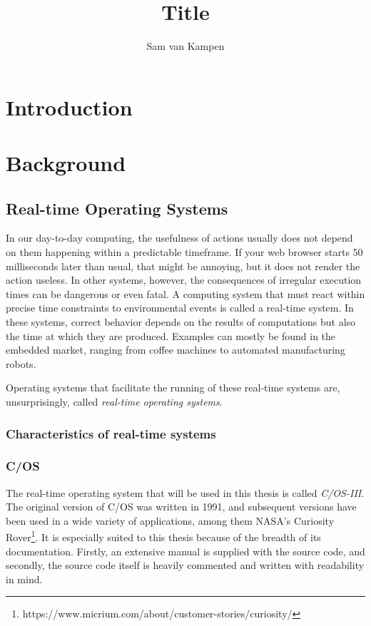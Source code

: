 \documentclass[twoside]{uva-inf-bachelor-thesis}
\title{Title}
\author{Sam van Kampen}
\newcommand{\ucosiii}{\textmu C/OS-III\xspace}
\newcommand{\ucos}{\textmu C/OS\xspace}
\begin{document}
\maketitle

\begin{abstract}
\end{abstract}

\tableofcontents

\chapter{Introduction}
\chapter{Background}
\section{Real-time Operating Systems}
In our day-to-day computing, the usefulness of actions usually does not depend on them happening within a predictable timeframe. If your web browser starts 50 milliseconds later than usual, that might be annoying, but it does not render the action useless. In other systems, however, the consequences of irregular execution times can be dangerous or even fatal. A computing system that must react within precise time constraints to environmental events is called a real-time system\cite{buttazzo2011hard}. In these systems, correct behavior depends on the results of computations but also the time at which they are produced. Examples can mostly be found in the embedded market, ranging from coffee machines to automated manufacturing robots.

Operating systems that facilitate the running of these real-time systems are, unsurprisingly, called \textit{real-time operating systems}.

\subsection{Characteristics of real-time systems}


\subsection{\ucos} \label{sec:ucos}
The real-time operating system that will be used in this thesis is called \textit{\ucosiii}. The original version of \ucos was written in 1991, and subsequent versions have been used in a wide variety of applications, among them NASA's Curiosity Rover\footnote{https://www.micrium.com/about/customer-stories/curiosity/}. It is especially suited to this thesis because of the breadth of its documentation. Firstly, an extensive manual \cite{micrium:ucosmanual} is supplied with the source code, and secondly, the source code itself is heavily commented and written with readability in mind.
\end{document}
